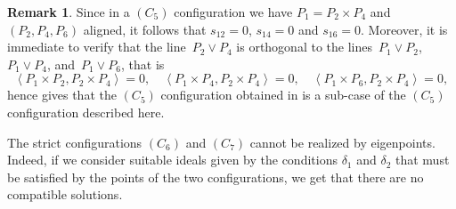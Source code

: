 \documentclass{amsart}
\theoremstyle{plain}
\theoremstyle{definition}
\newtheorem{rmk}[lemma]{Remark}
\newcommand{\scl}[2]{\left\langle {#1}, {#2} \right\rangle}
\begin{document}
\begin{rmk}
Since in a $(C_5)$ configuration we have 
$P_1 = P_2 \times P_4$ and $(P_2, P_4, P_6)$ aligned, it follows that $s_{12} = 0$,  $s_{14} = 0$ and $s_{16} = 0$.
Moreover, it is
immediate to verify that the line~$P_2 \vee P_4$ is orthogonal to the
lines~$P_1 \vee P_2$, $P_1 \vee P_4$, and~$P_1 \vee P_6$, that is
%
\[
  \scl{P_1 \times P_2}{P_2 \times P_4} = 0, \quad
  \scl{P_1 \times P_4}{P_2 \times P_4} = 0, \quad
  \scl{P_1 \times P_6}{P_2 \times P_4} = 0,
\]
hence  gives that the $(C_5)$ configuration obtained in  is a sub-case of the $(C_5)$ configuration described here.
%
\end{rmk}
%


The strict configurations $(C_6)$ and $(C_7)$ cannot be realized by eigenpoints. Indeed, if we consider suitable ideals given by the conditions
$\delta_1$ and $\delta_2$ that must be satisfied by the points of the two configurations, we get that there are no compatible solutions.
\end{document}
